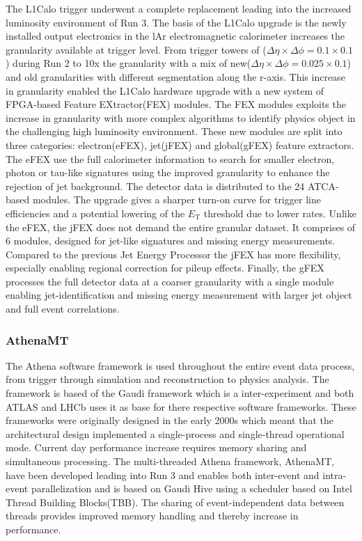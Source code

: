 The L1Calo trigger underwent a complete replacement leading into the increased luminosity environment of Run 3. The basis of the L1Calo upgrade is the newly installed output electronics in the lAr electromagnetic calorimeter increases the granularity available at trigger level. From trigger towers of ($\Delta\eta\times\Delta\phi=0.1\times0.1$) during Run 2 to 10x the granularity with a mix of new($\Delta\eta\times\Delta\phi=0.025\times0.1$) and old granularities with different segmentation along the r-axis. This increase in granularity enabled the L1Calo hardware upgrade with a new system of FPGA-based Feature EXtractor(FEX) modules. The FEX modules exploits the increase in granularity with more complex algorithms to identify physics object in the challenging high luminosity environment. These new modules are split into three categories: electron(eFEX), jet(jFEX) and global(gFEX) feature extractors. The eFEX use the full calorimeter information to search for smaller electron, photon or tau-like signatures using the improved granularity to enhance the rejection of jet background. The detector data is distributed to the 24 ATCA-based modules. The upgrade gives a sharper turn-on curve for trigger line efficiencies and a potential lowering of the $E_{\text{T}}$ threshold due to lower rates. Unlike the eFEX, the jFEX does not demand the entire granular dataset. It comprises of 6 modules, designed for jet-like signatures and missing energy measurements. Compared to the previous Jet Energy Processor the jFEX has more flexibility, especially enabling regional correction for pileup effects. Finally, the gFEX processes the full detector data at a coarser granularity with a single module enabling jet-identification and missing energy measurement with larger jet object and full event correlations\cite{Mkrtchyan:2843493}.


\subsubsection{AthenaMT}

The Athena\cite{Athena:865624} software framework is used throughout the entire event data process, from trigger through simulation and reconstruction to physics analysis. The framework is based of the Gaudi\cite{Gaudi:200145} framework which is a inter-experiment and both ATLAS and LHCb uses it as base for there respective software frameworks. These frameworks were originally designed in the early 2000s which meant that the architectural design implemented a single-process and single-thread operational mode. Current day performance increase requires memory sharing and simultaneous processing. The multi-threaded Athena framework, AthenaMT\cite{Bielski_2020}, have been developed leading into Run 3 and enables both inter-event and intra-event parallelization and is based on Gaudi Hive using a scheduler based on Intel Thread Building Blocks(TBB). The sharing of event-independent data between threads provides improved memory handling and thereby increase in performance.

